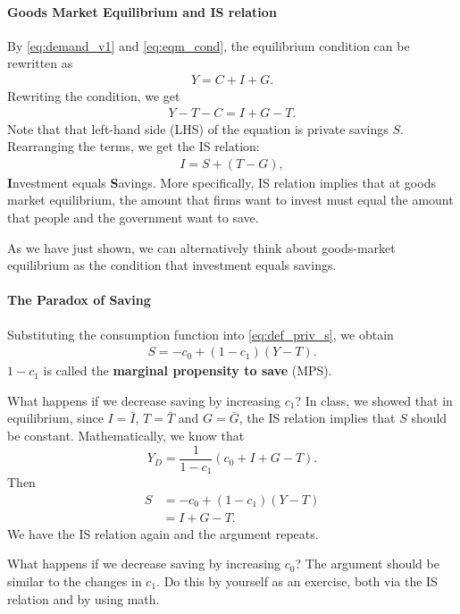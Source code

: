 \documentclass[12pt]{article}
\begin{document}
\paragraph{Goods Market Equilibrium and IS relation}
By \eqref{eq:demand_v1} and \eqref{eq:eqm_cond}, the equilibrium condition can be rewritten as
\begin{align}\label{eq:eqm_cond_v2}
    Y = C + I + G.
\end{align}
Rewriting the condition, we get
\begin{align*}
    Y - T - C = I + G - T.
\end{align*}
Note that that left-hand side (LHS) of the equation is private savings $S$. Rearranging the terms, we get the IS relation:
\begin{align*}
    I = S + (T-G),
\end{align*}
\textbf{I}nvestment equals \textbf{S}avings. More specifically, IS relation implies that at goods market equilibrium, the amount that firms want to invest must equal the amount that people and the government want to save.

As we have just shown, we can alternatively think about goods-market equilibrium as the condition that investment equals savings.

\paragraph{The Paradox of Saving}
Substituting the consumption function into \eqref{eq:def_priv_s}, we obtain
\begin{align*}
    S = -c_0 + (1-c_1)(Y-T).
\end{align*}
$1-c_1$ is called the \textbf{marginal propensity to save} (MPS).

What happens if we decrease saving by increasing $c_1$? In class, we showed that in equilibrium, since $I=\bar{I}$, $T=\bar{T}$ and $G=\bar{G}$, the IS relation implies that $S$ should be constant. Mathematically, we know that
\[Y_D = \frac{1}{1-c_1} (c_0 + I + G -T).\]
Then 
\begin{align*}
    S &= -c_0 + (1-c_1)(Y-T)\\
    &= I + G - T.
\end{align*}
We have the IS relation again and the argument repeats.

What happens if we decrease saving by increasing $c_0$? The argument should be similar to the changes in $c_1$. Do this by yourself as an exercise, both via the IS relation and by using math.
\end{document}
